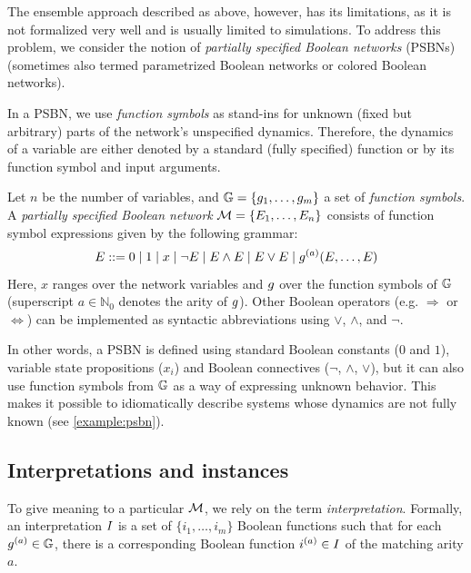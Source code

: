 The ensemble approach described as above, however, has its limitations, as it is not formalized very well and is usually limited to simulations. To address this problem, we consider the notion of \emph{partially specified Boolean networks} (PSBNs)~\cite{Benes2019,benevs2022bdd} (sometimes also termed parametrized Boolean networks or colored Boolean networks). 

In a PSBN, we use \emph{function symbols} as stand-ins for unknown (fixed but arbitrary) parts of the network's unspecified dynamics. Therefore, the dynamics of a variable are either denoted by a standard (fully specified) function or by its function symbol and input arguments.
\begin{definition}
	Let $n$ be the number of variables, and $\mathbb{G} = \{g_1,  \dots, g_m \}$ a set of \emph{function symbols}. A \emph{partially specified Boolean network} $\mathcal{M} = \{ E_1, \ldots, E_n \}$ consists of function symbol expressions given by the following grammar:
	$$
		E ::= 0 \mid 1 \mid x \mid \neg E \mid E \land E \mid E \lor E \mid g^{(a)}(E, \ldots, E) 
	$$
	Here, $x$ ranges over the network variables and $g$ over the function symbols of $\mathbb{G}$ (superscript $a \in \mathbb{N}_0$ denotes the arity of $g$). Other Boolean operators (e.g. $\Rightarrow$ or $\Leftrightarrow$) can be implemented as syntactic abbreviations using $\lor$, $\land$, and $\neg$.
\end{definition}

In other words, a PSBN is defined using standard Boolean constants ($0$ and $1$), variable state propositions ($x_i$) and Boolean connectives ($\neg$, $\land$, $\lor$), but it can also use function symbols from $\mathbb{G}$ as a way of expressing unknown behavior. This makes it possible to idiomatically describe systems whose dynamics are not fully known (see \autoref{example:psbn}).

\subsection{Interpretations and instances}

To give meaning to a particular $\mathcal{M}$, we rely on the term \emph{interpretation}. Formally, an interpretation $I$ is a set of $\{i_1, \ldots, i_m \}$ Boolean functions such that for each $g^{(a)} \in \mathbb{G}$, there is a corresponding Boolean function $i^{(a)} \in I$ of the matching arity $a$. 

